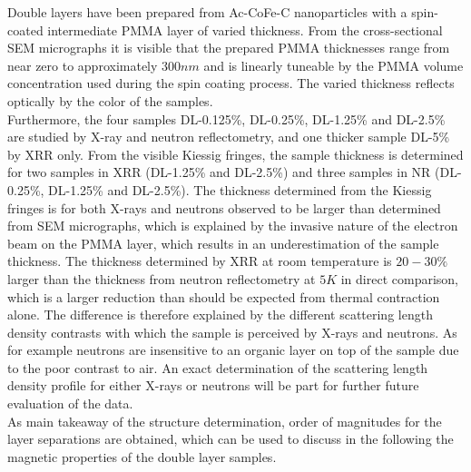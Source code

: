 \documentclass[\main/dresen_thesis.tex]{subfiles}
\begin{document}
  \label{sec:doublelayers:structuralCharacterization:summary}

  Double layers have been prepared from Ac-CoFe-C nanoparticles with a spin-coated intermediate PMMA layer of varied thickness.
  From the cross-sectional SEM micrographs it is visible that the prepared PMMA thicknesses range from near zero to approximately $300 \unit{nm}$ and is linearly tuneable by the PMMA volume concentration used during the spin coating process.
  The varied thickness reflects optically by the color of the samples.
  \\

  Furthermore, the four samples DL-0.125\%, DL-0.25\%, DL-1.25\% and DL-2.5\% are studied by X-ray and neutron reflectometry, and one thicker sample DL-5\% by XRR only.
  From the visible Kiessig fringes, the sample thickness is determined for two samples in XRR (DL-1.25\% and DL-2.5\%) and three samples in NR (DL-0.25\%, DL-1.25\% and DL-2.5\%).
  The thickness determined from the Kiessig fringes is for both X-rays and neutrons observed to be larger than determined from SEM micrographs, which is explained by the invasive nature of the electron beam on the PMMA layer, which results in an underestimation of the sample thickness.
  The thickness determined by XRR at room temperature is $20 - 30\%$ larger than the thickness from neutron reflectometry at $5 \unit{K}$ in direct comparison, which is a larger reduction than should be expected from thermal contraction alone.
  The difference is therefore explained by the different scattering length density contrasts with which the sample is perceived by X-rays and neutrons.
  As for example neutrons are insensitive to an organic layer on top of the sample due to the poor contrast to air.
  An exact determination of the scattering length density profile for either X-rays or neutrons will be part for further future evaluation of the data.
  \\

  As main takeaway of the structure determination, order of magnitudes for the layer separations are obtained, which can be used to discuss in the following the magnetic properties of the double layer samples.
\end{document}
